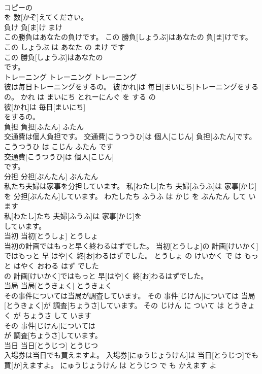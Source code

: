 \documentclass[8pt]{extreport}
\begin{document}
\begin{CJK}{UTF8}{min}
\\	コピーの
\\	を 数[かぞ]えてください。			
\\	負け	負[ま]け	まけ	
\\	この勝負はあなたの負けです。	この 勝負[しょうぶ]はあなたの 負[ま]けです。	この しょうぶ は あなた の まけ です	
\\	この 勝負[しょうぶ]はあなたの
\\	です。			
\\	トレーニング	トレーニング	トレーニング	
\\	彼は毎日トレーニングをするの。	彼[かれ]は 毎日[まいにち]トレーニングをするの。	かれ は まいにち とれーにんぐ を する の	
\\	彼[かれ]は 毎日[まいにち]
\\	をするの。			
\\	負担	負担[ふたん]	ふたん	
\\	交通費は個人負担です。	交通費[こうつうひ]は 個人[こじん] 負担[ふたん]です。	こうつうひ は こじん ふたん です	
\\	交通費[こうつうひ]は 個人[こじん]
\\	です。			
\\	分担	分担[ぶんたん]	ぶんたん	
\\	私たち夫婦は家事を分担しています。	私[わたし]たち 夫婦[ふうふ]は 家事[かじ]を 分担[ぶんたん]しています。	わたしたち ふうふ は かじ を ぶんたん して います	
\\	私[わたし]たち 夫婦[ふうふ]は 家事[かじ]を
\\	しています。			
\\	当初	当初[とうしょ]	とうしょ	
\\	当初の計画ではもっと早く終わるはずでした。	当初[とうしょ]の 計画[けいかく]ではもっと 早[はや]く 終[お]わるはずでした。	とうしょ の けいかく で は もっと はやく おわる はず でした	
\\	の 計画[けいかく]ではもっと 早[はや]く 終[お]わるはずでした。			
\\	当局	当局[とうきょく]	とうきょく	
\\	その事件については当局が調査しています。	その 事件[じけん]については 当局[とうきょく]が 調査[ちょうさ]しています。	その じけん に ついて は とうきょく が ちょうさ して います	
\\	その 事件[じけん]については
\\	が 調査[ちょうさ]しています。			
\\	当日	当日[とうじつ]	とうじつ	
\\	入場券は当日でも買えますよ。	入場券[にゅうじょうけん]は 当日[とうじつ]でも 買[か]えますよ。	にゅうじょうけん は とうじつ で も かえます よ	

\end{CJK}
\end{document}
